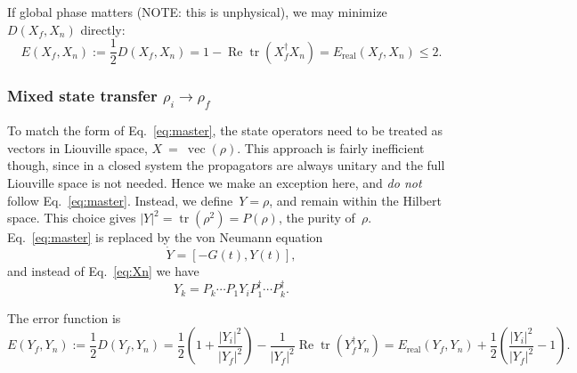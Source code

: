 \documentclass[aps, pra, a4paper, longbibliography]{revtex4}
\newcommand{\be}{\begin{equation}}
\newcommand{\ee}{\end{equation}}
\newcommand{\ket}[1]{\left| #1 \right \rangle}
\newcommand{\bra}[1]{\left \langle #1 \right|}
\newcommand{\braket}[2]{\left \langle #1 | #2 \right \rangle}
\newcommand{\ketbra}[2]{\left| #1 \right \rangle \left \langle #2 \right|}
\newcommand{\comm}[2]{\left[ #1, #2 \right]}
\DeclareMathOperator{\tr}{tr}
\DeclareMathOperator{\re}{Re}
\DeclareMathOperator{\cvec}{vec}
\begin{document}
\begin{comment}
This result can also be obtained using the mixed state formula in the
vec representation, with $\rho = \ketbra{\psi}{\psi}$ and thus
$X = \cvec(\rho) = \ket{\psi^*} \otimes \ket{\psi}$.
The fidelity diagram breaks into two pieces and
we obtain
\be
f(X_f, X_n)
= (\re) \left|(\tr) \bra{\psi_f}  P_n \cdots P_1 \ket{\psi_i} \right|^2.
\ee
with $0 \le f(X_f, X_n) \le 1$.
Thus the problem simplifies back into Hilbert space
(albeit with an extra absolute value squared in the expression for the fidelity), and we may equivalently
choose $X = \ket{\psi}$.
\end{comment}


If global phase matters (NOTE: this is unphysical), we may minimize
$D(X_f, X_n)$ directly:
\be
E(X_f, X_n)
:= \frac{1}{2} D(X_f, X_n)
= 1 -\re \tr(X_f^\dagger X_n)
= E_\text{real}(X_f, X_n) \le 2.
\ee



\subsubsection{Mixed state transfer $\rho_i \to \rho_f$}
\label{sec:closed-mixed}

To match the form of Eq.~\eqref{eq:master},
the state operators need to be treated as vectors in Liouville space,
$X~=~\cvec(\rho)$.
This approach is fairly inefficient though, since in a closed system the
propagators are always unitary and the full Liouville space is not
needed. Hence we make an exception here, and \emph{do not} follow Eq.~\eqref{eq:master}.
Instead, we define~$Y = \rho$, and remain within the Hilbert space.
This choice gives $|Y|^2 = \tr(\rho^2) = P(\rho)$, the purity of~$\rho$.
Eq.~\eqref{eq:master} is replaced by the von Neumann equation
\be
\dot{Y} = \comm{-G(t)}{Y(t)},
\ee
and instead of Eq.~\eqref{eq:Xn} we have
\be
Y_k = P_k \cdots P_1 Y_i P_1^\dagger \cdots P_k^\dagger.
\ee

The error function is
\be
E(Y_f, Y_n)
:= \frac{1}{2} D(Y_f, Y_n)
= \frac{1}{2}\left(1 +\frac{|Y_i|^2}{|Y_f|^2}\right) -\frac{1}{|Y_f|^2} \re \tr(Y_f^\dagger Y_n)
= E_\text{real}(Y_f, Y_n) +\frac{1}{2}\left(\frac{|Y_i|^2}{|Y_f|^2} -1\right).
\ee


\begin{comment}
The goal here is to minimize state operator distance
$D(X_f, X_n) = D(\rho_f, \rho_n)$.
$|X|^2$~is equivalent to the purity of the state:
\be
|X|^2
= |\cvec(\rho)|^2
= |\rho|^2
= \tr(\rho^2)
= P(\rho).
\ee
Unitary propagation conserves purity, hence (X1) holds, and we can
simply maximize the fidelity
\be
f(X_f, X_n)
= \frac{1}{P(\rho_f)} (\re) (\tr) \left( X_f^\dagger  P_n \cdots P_1 X_i \right).
\ee
Furthermore, the fidelity is strictly nonnegative since the
state operators are positive:
\be
0 \le f(X_f, X_n) \le \sqrt{\frac{P(\rho_i)}{P(\rho_f)}}.
\ee
If either $\rho_f$ or $\rho_i$ is pure,
$\rho = \ketbra{\psi}{\psi}$,
we have $|\rho|^2 = \braket{\psi}{\psi}^2 = 1$, and
the diagram simplifies by splitting up.
\end{comment}
\end{document}
